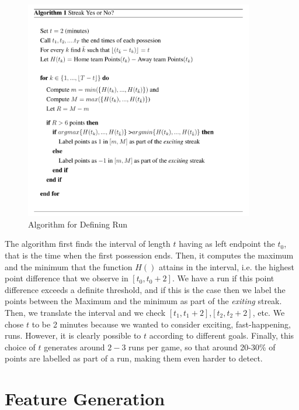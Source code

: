 \documentclass{article}
\begin{document}
\begin{figure}[h]
\begin{center}
\includegraphics[width=100mm]{alg_screen.png}
\caption{Algorithm for Defining Run}
\end{center}
\end{figure}

The algorithm first finds the interval of length $t$ having as left endpoint the $t_0$, that is the time when the first possession ends. Then, it computes the maximum and the minimum that the function $H()$ attains in the interval, i.e. the highest point difference that we observe in $[t_0,t_0+2]$. We have a run if this point difference exceeds a definite threshold, and if this is the case then we label the points between the Maximum and the minimum as part of the \textit{exiting} streak. Then, we translate the interval and we check $[t_1,t_1+2]$,$[t_2,t_2+2]$, etc. We chose $t$ to be 2 minutes because we wanted to consider exciting,  fast-happening, runs. However, it is clearly possible to $t$ according to different goals. Finally, this choice of $t$ generates around $2-3$ runs per game, so that around 20-30\% of points are labelled as part of a run, making them even harder to detect. 


\section{Feature Generation}
\end{document}
